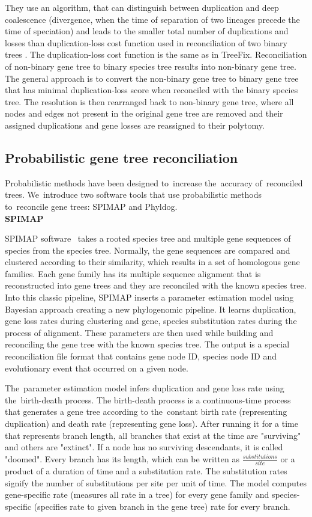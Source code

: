 They use an algorithm, that can distinguish between duplication and deep coalescence (divergence, when the time of separation of two lineages precede the time of speciation) and leads to the smaller total number of duplications and losses than duplication-loss cost function used in reconciliation of two binary trees \cite{vernot}. The duplication-loss cost function is the same as in TreeFix. Reconciliation of non-binary gene tree to binary species tree results into non-binary gene tree. The general approach is to convert the non-binary gene tree to binary gene tree that has minimal duplication-loss score when reconciled with the binary species tree. The resolution is then rearranged back to non-binary gene tree, where all nodes and edges not present in the original gene tree are removed and their assigned duplications and gene losses are reassigned to their polytomy.

\subsection{Probabilistic gene tree reconciliation}
Probabilistic methods have been designed to~increase the~accuracy of~reconciled trees. We~introduce two software tools that use probabilistic methods to~reconcile gene trees: SPIMAP and Phyldog.\\
\textbf{SPIMAP}

SPIMAP software~\cite{spimap_online} takes a rooted species tree and multiple gene sequences of species from the species tree. Normally, the gene sequences are compared and clustered according to their similarity, which results in a set of homologous gene families. Each gene family has its multiple sequence alignment that is reconstructed into gene trees and they are reconciled with the known species tree. Into this classic pipeline, SPIMAP inserts a parameter estimation model using Bayesian approach creating a new phylogenomic pipeline. It learns duplication, gene loss rates during clustering and gene, species substitution rates during the process of alignment. These parameters are then used while building and reconciling the gene tree with the known species tree. The output is a special reconciliation file format that contains gene node ID, species node ID and evolutionary event that occurred on a given node.

The~parameter estimation model \cite{spimap} infers duplication and gene loss rate using the~birth-death process. The birth-death process is a continuous-time process that generates a gene tree according to the~constant birth rate (representing duplication) and death rate (representing gene loss). After running it for a time that represents branch length, all branches that exist at the time are "surviving" and others are "extinct". If a node has no surviving descendants, it is called "doomed". Every branch has its length, which can be written as  \( \frac{substitutions}{site} \) or a product of a duration of time and a substitution rate. The substitution rates signify the number of substitutions per site per unit of time. The model computes gene-specific rate (measures all rate in a tree) for every gene family and species-specific (specifies rate to given branch in the gene tree) rate for every branch.

